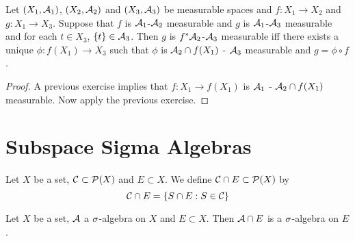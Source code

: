 \documentclass{book}
\begin{document}
	\begin{ex} 
		Let $(X_1, \mathcal{A}_1)$, $(X_2, \mathcal{A}_2)$ and $(X_3, \mathcal{A}_3)$ be measurable spaces and $f: X_1 \rightarrow X_2$ and $g:X_1 \rightarrow X_3$. Suppose that $f$ is $\mathcal{A}_1$-$\mathcal{A}_2$ measurable and $g$ is $\mathcal{A}_1$-$\mathcal{A}_3$ measurable and for each $t \in X_3$, $\{t\} \in \mathcal{A}_3$. Then $g$ is $f^*\mathcal{A}_2$-$\mathcal{A}_3$ measurable iff there exists a unique $\phi: f(X_1) \rightarrow X_3$ such that $\phi$ is $\mathcal{A}_2 \cap f(X_1)$ - $\mathcal{A}_3$ measurable and $g = \phi \circ f$. \\
	\end{ex}
	
	\begin{proof}
		A previous exercise implies that $f: X_1 \rightarrow f(X_1)$ is $\mathcal{A}_1$ - $\mathcal{A}_2 \cap f(X_1)$ measurable. Now apply the previous exercise. 
	\end{proof}


	
	
	
	
	
	
	
	
	
	
	
	
	
	
	
	
	
	
	
	
	
	
	
	
	
	\newpage
	\section{Subspace Sigma Algebras}
	
	\begin{defn}  
		Let $X$ be a set, $\mathcal{C} \subset \mathcal{P}(X)$ and $E \subset X$. We define $\mathcal{C} \cap E \subset \mathcal{P}(X)$ by $$\mathcal{C} \cap E = \{S \cap E: S \in \mathcal{C}\}$$ 
	\end{defn}
	
	\begin{ex}  
		Let $X$ be a set, $\mathcal{A}$ a $\sigma$-algebra on $X$ and $E \subset X$. Then 
		$\mathcal{A} \cap E$ is a $\sigma$-algebra on $E$. 
	\end{ex}
	
\end{document}
